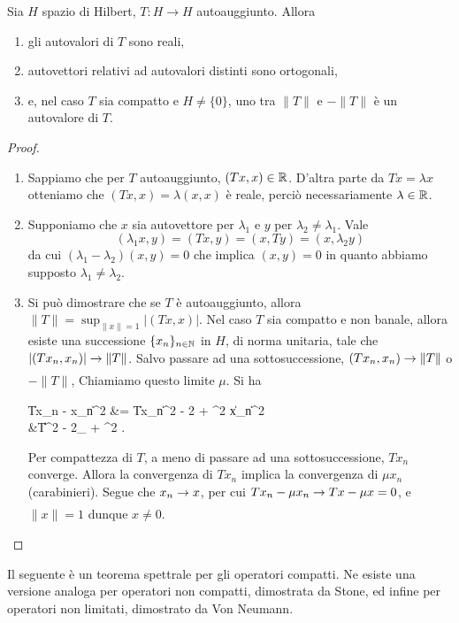 \begin{lemma}
\label{lemma:ops_spectral_selfadjoint}
	Sia $H$ spazio di Hilbert, $T:H \to H$ autoauggiunto.
	Allora
	\begin{enumerate}
		\item gli autovalori di $T$ sono reali,
		\item autovettori relativi ad autovalori distinti sono ortogonali,
		\item e, nel caso $T$ sia compatto e $H\neq \{0\}$, uno tra $\|T\|$ e $-\|T\|$ è un autovalore di $T$.
	\end{enumerate}
\end{lemma}
\begin{proof}
	\leavevmode
	\begin{enumerate}
		\item Sappiamo che per $T$ autoauggiunto, $(Tx,x) \in \mathbb{R}$. D'altra parte da $Tx=\lambda x$ otteniamo che $(Tx,x) = \lambda (x,x)$ è reale, perciò necessariamente $\lambda \in \mathbb{R}$.
		\item Supponiamo che $x$ sia autovettore per $\lambda_1$ e $y$ per $\lambda_2 \neq \lambda_1$. Vale
		\begin{equation*}
			(\lambda_1 x, y) = (Tx, y) = (x, Ty) = (x, \lambda_2 y)
		\end{equation*}
		da cui $(\lambda_1 - \lambda_2)(x,y) = 0$ che implica $(x,y) = 0$ in quanto abbiamo supposto $\lambda_1 \neq \lambda_2$.
		\item Si può dimostrare che se $T$ è autoauggiunto, allora $\|T\| = \sup_{\|x\|=1} |(Tx,x)|$. Nel caso $T$ sia compatto e non banale, allora esiste una successione $\{x_n\}_{n \in \mathbb{N}}$ in $H$, di norma unitaria, tale che $|(Tx_n,x_n)| \underset{{}}{\rightarrow} \|T\|$.
		Salvo passare ad una sottosuccessione, $(Tx_n, x_n) \underset{{}}{\rightarrow} \|T\|$ o $-\|T\|$, Chiamiamo questo limite $\mu$. Si ha
		\begin{eqalign*}
			\|Tx_n - \mu x_n\|^2  &= \|Tx_n\|^2 - 2 \mu {} + \mu^2 \|x_n\|^2\\
			&\leq \|T\|^2 - 2\mu {}_{\conv \mu} + \mu^2 \conv 0.
		\end{eqalign*}
		Per compattezza di $T$, a meno di passare ad una sottosuccessione, $Tx_n$ converge. Allora la convergenza di $Tx_n$ implica la convergenza di $\mu x_n$ (carabinieri). Segue che $x_n \underset{{}}{\rightarrow} x$, per cui $Tx_n - \mu x_n \underset{{}}{\rightarrow} Tx - \mu x = 0$, e $\|x\| =1$ dunque $x \neq 0$.
	\end{enumerate}
\end{proof}

Il seguente è un teorema spettrale per gli operatori compatti. Ne esiste una versione analoga per operatori non compatti, dimostrata da Stone, ed infine per operatori non limitati, dimostrato da Von Neumann.

